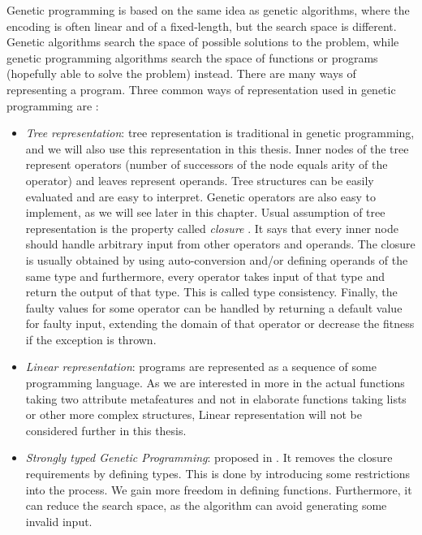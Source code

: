  Genetic programming is based on the same idea as genetic algorithms, where the encoding is often linear and of a fixed-length, but the search space is different. Genetic algorithms search the space of possible solutions to the problem, while genetic programming algorithms search the space of functions or programs (hopefully able to solve the problem) instead. 
 There are many ways of representing a program. Three common ways of representation used in genetic programming are \cite{FieldGuideToGeneticProgramming}:
 \begin{itemize}
 	\item \emph{Tree representation}: tree representation is traditional in genetic programming, and we will also use this representation in this thesis. Inner nodes of the tree represent operators (number of successors of the node equals arity of the operator) and leaves represent operands. Tree structures can be easily evaluated and are easy to interpret. Genetic operators are also easy to implement, as we will see later in this chapter. Usual assumption of tree representation is the property called \emph{closure} \cite{FieldGuideToGeneticProgramming}. It says that every inner node should handle arbitrary input from other operators and operands. The closure is usually obtained by using auto-conversion and/or defining operands of the same type and furthermore, every operator takes input of that type and return the output of that type. This is called type consistency. Finally, the faulty values for some operator can be handled by returning a default value for faulty input, extending the domain of that operator or decrease the fitness if the exception is thrown.
 	
 	\item \emph{Linear representation}: programs are represented as a sequence of some programming language. As we are interested in more in the actual functions taking two attribute metafeatures and not in elaborate functions taking lists or other more complex structures, Linear representation will not be considered further in this thesis.
 	
 	\item \emph{Strongly typed Genetic Programming}: proposed in \cite{typedGp}. It removes the closure requirements by defining types. This is done by introducing some restrictions into the process. We gain more freedom in defining functions. Furthermore, it can reduce the search space, as the algorithm can avoid generating some invalid input.
 	
 \end{itemize}
